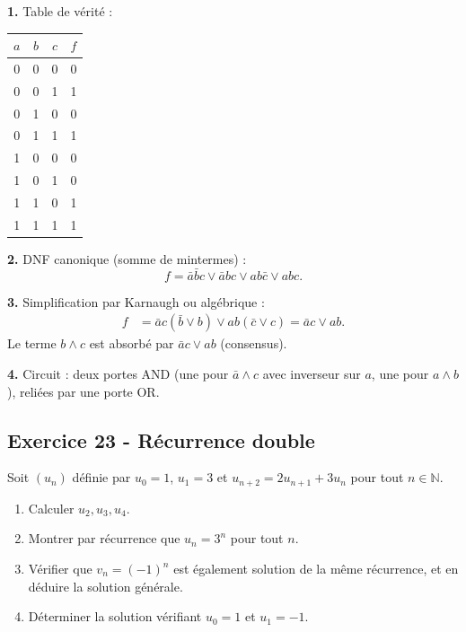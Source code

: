 \documentclass[12pt,a4paper]{article}
\begin{document}
\begin{boitecorrige}
\textbf{1.} Table de vérité :
\begin{center}
\renewcommand{\arraystretch}{1.15}
\begin{tabular}{|c|c|c|c|}
\hline
$a$ & $b$ & $c$ & $f$\\
\hline
0 & 0 & 0 & 0\\
0 & 0 & 1 & 1\\
0 & 1 & 0 & 0\\
0 & 1 & 1 & 1\\
1 & 0 & 0 & 0\\
1 & 0 & 1 & 0\\
1 & 1 & 0 & 1\\
1 & 1 & 1 & 1\\
\hline
\end{tabular}
\end{center}

\textbf{2.} DNF canonique (somme de mintermes) :
\[
f = \bar a\bar b c \vee \bar a b c \vee a b \bar c \vee a b c.
\]

\textbf{3.} Simplification par Karnaugh ou algébrique :
\begin{align*}
f &= \bar a c(\bar b \vee b) \vee ab(\bar c \vee c) = \bar a c \vee ab.
\end{align*}
Le terme $b\wedge c$ est absorbé par $\bar a c \vee ab$ (consensus).

\textbf{4.} Circuit : deux portes AND (une pour $\bar a\wedge c$ avec inverseur sur $a$, une pour $a\wedge b$), reliées par une porte OR.
\end{boitecorrige}

\subsection*{Exercice 23 - Récurrence double \niveau{\moyen}}

\begin{boiteexercice}
Soit $(u_n)$ définie par $u_0 = 1$, $u_1 = 3$ et $u_{n+2} = 2u_{n+1} + 3u_n$ pour tout $n\in\mathbb{N}$.
\begin{enumerate}
  \item Calculer $u_2, u_3, u_4$.
  \item Montrer par récurrence que $u_n = 3^n$ pour tout $n$.
  \item Vérifier que $v_n = (-1)^n$ est également solution de la même récurrence, et en déduire la solution générale.
  \item Déterminer la solution vérifiant $u_0 = 1$ et $u_1 = -1$.
\end{enumerate}
\end{boiteexercice}
\end{document}
